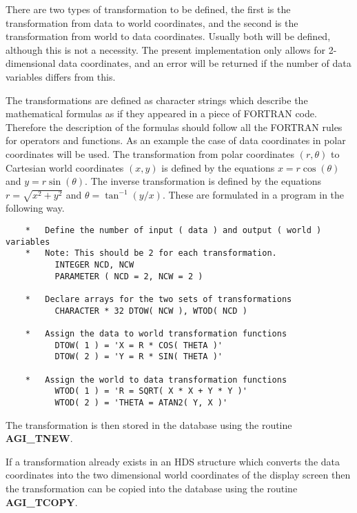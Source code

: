 There are two types of transformation to be defined, the first is the
transformation from data to world coordinates, and the second is the
transformation from world to data coordinates. Usually both will be
defined, although this is not a necessity.
The present implementation only allows for 2-dimensional data
coordinates, and an error will be returned if the number of data
variables differs from this.

The transformations are defined as character strings which describe the
mathematical formulas as if they appeared in a piece of FORTRAN code.
Therefore the description of the formulas should follow all the FORTRAN
rules for operators and functions. As an example the case of data
coordinates in polar coordinates will be used. The transformation
from polar coordinates $(r,\theta)$ to Cartesian world coordinates $(x,y)$
is defined by the equations
$x = r \cos( \theta )$ and $y = r \sin( \theta )$.
The inverse transformation is defined by the equations
$r = \sqrt{x^2+y^2}$ and $\theta = \tan^{-1}(y/x)$.
These are formulated in a program in the following way.
\begin{verbatim}
    *   Define the number of input ( data ) and output ( world ) variables
    *   Note: This should be 2 for each transformation.
          INTEGER NCD, NCW
          PARAMETER ( NCD = 2, NCW = 2 )

    *   Declare arrays for the two sets of transformations
          CHARACTER * 32 DTOW( NCW ), WTOD( NCD )

    *   Assign the data to world transformation functions
          DTOW( 1 ) = 'X = R * COS( THETA )'
          DTOW( 2 ) = 'Y = R * SIN( THETA )'

    *   Assign the world to data transformation functions
          WTOD( 1 ) = 'R = SQRT( X * X + Y * Y )'
          WTOD( 2 ) = 'THETA = ATAN2( Y, X )'
\end{verbatim}

The transformation is then stored in the database using the routine
{\bf AGI\_TNEW}.

If a transformation already exists in an HDS structure which converts
the data coordinates into the two dimensional world coordinates of the
display screen then the transformation can be copied into the database
using the routine {\bf AGI\_TCOPY}.

